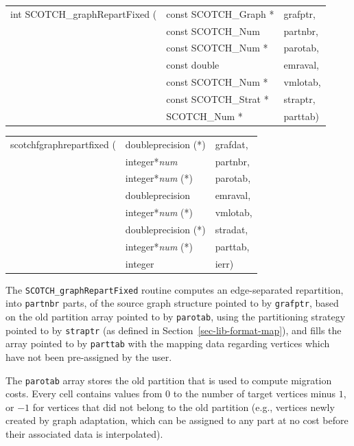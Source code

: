 \begin{itemize}
\progsyn

{\tt\begin{tabular}{l@{}ll}
int SCOTCH\_graphRepartFixed ( & const SCOTCH\_Graph * & grafptr, \\
                               & const SCOTCH\_Num     & partnbr, \\
                               & const SCOTCH\_Num *   & parotab, \\
                               & const double          & emraval, \\
                               & const SCOTCH\_Num *   & vmlotab, \\
                               & const SCOTCH\_Strat * & straptr, \\
                               & SCOTCH\_Num *         & parttab)
\end{tabular}}

{\tt\begin{tabular}{l@{}ll}
scotchfgraphrepartfixed ( & doubleprecision (*)   & grafdat, \\
                          & integer*{\it num}     & partnbr, \\
                          & integer*{\it num} (*) & parotab, \\
                          & doubleprecision       & emraval, \\
                          & integer*{\it num} (*) & vmlotab, \\
                          & doubleprecision (*)   & stradat, \\
                          & integer*{\it num} (*) & parttab, \\
                          & integer               & ierr)
\end{tabular}}

\progdes

The {\tt SCOTCH\_graphRepartFixed} routine computes an edge-separated
repartition, into {\tt partnbr} parts, of the source graph structure
pointed to by {\tt grafptr}, based on the old partition array pointed
to by {\tt parotab}, using the partitioning strategy pointed to by
{\tt straptr} (as defined in Section~\ref{sec-lib-format-map}),
and fills the array pointed to by {\tt parttab} with the mapping data
regarding vertices which have not been pre-assigned by the user.

The {\tt parotab} array stores the old partition that is used to
compute migration costs. Every cell contains values from $0$ to the
number of target vertices minus $1$, or $-1$ for vertices that did not
belong to the old partition (e.g., vertices newly created by graph
adaptation, which can be assigned to any part at no cost before
their associated data is interpolated).


\end{itemize}
